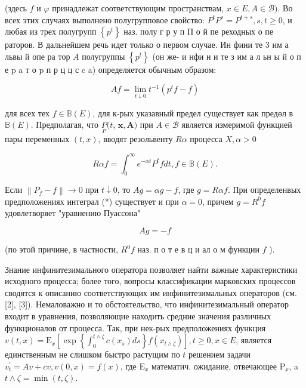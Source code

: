 \documentclass[10pt]{article}
\begin{document}
(здесь $f$ и $\varphi$ принадлежат соответствующим пространствам, $x \in E, A \in \mathscr{B})$. Во всех этих случаях выполнено полугрупповое свойство: $P^{t} P^{s}=P^{t+s}, s, t \geqslant 0$, и любая из трех полугрупп $\left\{p^{t}\right\}$ наз. полу г р у п П о й пе реходных о пе раторов. В дальнейшем речь идет только о первом случае. Ин фини те 3 им а львы й опе ра тор $A$ полугруппы $\left\{p^{t}\right\}$ (он же- и нфи н и те з им а л ьн ы й о п е p a т о p п р ц ц с c a) определяется обычным образом:



\[

A f=\lim _{t \downarrow 0} t^{-1}\left(p^{t} f-f\right)

\]



для всех тех $f \in \mathbb{B}(E)$, для к-рых указавный предел существует как предөл в $\mathbb{B}(E)$. Предполагая, что $\underset{P}{P}(t$, $\boldsymbol{x}, \boldsymbol{A})$ при $A \in \mathscr{B}$ является измеримой функцией пары переменных $(t, x)$, вводят резольвенту $R \alpha$ процесса $X, \alpha>0$



\[

R \alpha f=\int_{0}^{\infty} e^{-\alpha t} P^{t} f d t, f \in \mathbb{B}(E) .

\]



Если $\left\|P_{f}-f\right\| \rightarrow 0$ при $t \downarrow 0$, то $A g=\alpha g-f$, где $g=R \alpha f$. При определенвых предположениях интеграл (*) существует и при $\alpha=0$, причем $g=R^{0} f$ удовлетворяет "уравнению Пуассона"



\[

A g=-f

\]



(по этой причине, в частности, $R^{0} f$ наз. п о т е в ц и ал о м функции $f$ ).



Знание инфинитезимального оператора позволяет найти важные характеристики исходного процесса; более того, вопросы классификации марковских процессов сводятся к описанию соответствующих им инфинитезимальных операторов (см. [2], [3]). Немаловажно и то обстоятельство, что инфинитезимальный оператор входит в уравнения, позволяющие находить средние значения различных функционалов от процесса. Так, при нек-рых предположениях функция $v(t, x)=\mathrm{E}_{x}\left[\exp \left\{\int_{0}^{t \wedge \zeta} c\left(x_{s}\right) d s\right\} f\left(x_{t \wedge \zeta}\right)\right], t \geqslant 0, x \in E$, является единственным не слишком быстро растущим по $t$ решением задачи $v_{t}^{\prime}=A v+c v, v(0, x)=f(x)$, где $\mathrm{E}_{x}$ математич. ожидание, отвечающее $\mathrm{P}_{x}$, a $t \wedge \zeta=\min (t, \zeta)$.
\end{document}
